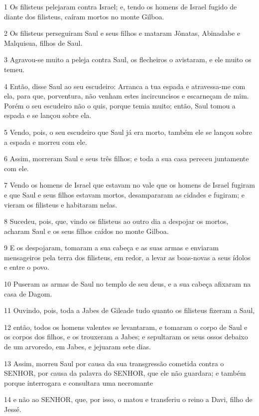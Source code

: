 \par 1 Os filisteus pelejaram contra Israel; e, tendo os homens de Israel fugido de diante dos filisteus, caíram mortos no monte Gilboa.
\par 2 Os filisteus perseguiram Saul e seus filhos e mataram Jônatas, Abinadabe e Malquisua, filhos de Saul.
\par 3 Agravou-se muito a peleja contra Saul, os flecheiros o avistaram, e ele muito os temeu.
\par 4 Então, disse Saul ao seu escudeiro: Arranca a tua espada e atravessa-me com ela, para que, porventura, não venham estes incircuncisos e escarneçam de mim. Porém o seu escudeiro não o quis, porque temia muito; então, Saul tomou a espada e se lançou sobre ela.
\par 5 Vendo, pois, o seu escudeiro que Saul já era morto, também ele se lançou sobre a espada e morreu com ele.
\par 6 Assim, morreram Saul e seus três filhos; e toda a sua casa pereceu juntamente com ele.
\par 7 Vendo os homens de Israel que estavam no vale que os homens de Israel fugiram e que Saul e seus filhos estavam mortos, desampararam as cidades e fugiram; e vieram os filisteus e habitaram nelas.
\par 8 Sucedeu, pois, que, vindo os filisteus ao outro dia a despojar os mortos, acharam Saul e os seus filhos caídos no monte Gilboa.
\par 9 E os despojaram, tomaram a sua cabeça e as suas armas e enviaram mensageiros pela terra dos filisteus, em redor, a levar as boas-novas a seus ídolos e entre o povo.
\par 10 Puseram as armas de Saul no templo de seu deus, e a sua cabeça afixaram na casa de Dagom.
\par 11 Ouvindo, pois, toda a Jabes de Gileade tudo quanto os filisteus fizeram a Saul,
\par 12 então, todos os homens valentes se levantaram, e tomaram o corpo de Saul e os corpos dos filhos, e os trouxeram a Jabes; e sepultaram os seus ossos debaixo de um arvoredo, em Jabes, e jejuaram sete dias.
\par 13 Assim, morreu Saul por causa da sua transgressão cometida contra o SENHOR, por causa da palavra do SENHOR, que ele não guardara; e também porque interrogara e consultara uma necromante
\par 14 e não ao SENHOR, que, por isso, o matou e transferiu o reino a Davi, filho de Jessé.

